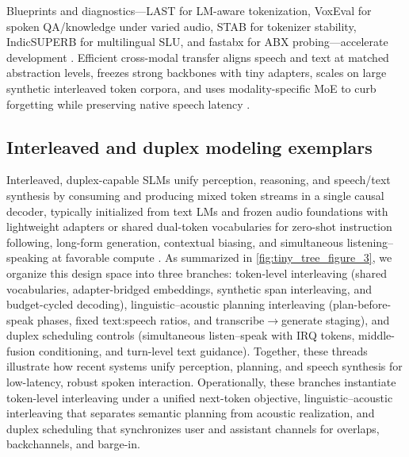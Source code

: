 \documentclass{article}
\begin{document}
Blueprints and diagnostics---LAST for LM-aware tokenization, VoxEval for spoken QA/knowledge under varied audio, STAB for tokenizer stability, IndicSUPERB for multilingual SLU, and fastabx for ABX probing---accelerate development \cite{turetzky2024lastlanguagemodelawarespeechtokenization,cui2025voxevalbenchmarkingknowledgeunderstandin,vashishth2024stabspeechtokenizerassessmentbenchmark,entry2025indicsuperbspeechprocessinguniversalperf,poli2025fastabxlibraryefficientcomputationabxdis}. Efficient cross-modal transfer aligns speech and text at matched abstraction levels, freezes strong backbones with tiny adapters, scales on large synthetic interleaved token corpora, and uses modality-specific MoE to curb forgetting while preserving native speech latency \cite{cuervo2025textspeechlanguagemodelsimprovedcrossmod,shao2025deeptalktowardsseamlesssmartspeechintera,wang2023slmbridgethingapbetweenspeechtextfoundat,zeng2024scalingspeechtextpretrainingsyntheticint,entry2025towardjointlanguagemodelingspeechunitste}.

\subsection{Interleaved and duplex modeling exemplars} \label{subsec:Interleaved and duplex modeling exemplars}
Interleaved, duplex-capable SLMs unify perception, reasoning, and speech/text synthesis by consuming and producing mixed token streams in a single causal decoder, typically initialized from text LMs and frozen audio foundations with lightweight adapters or shared dual-token vocabularies for zero-shot instruction following, long-form generation, contextual biasing, and simultaneous listening--speaking at favorable compute \cite{maimon2025scalinganalysisinterleavedspeechtextlang,park2025longformspeechgenerationspokenlanguagemo,wang2023slmbridgethingapbetweenspeechtextfoundat,wang2025dualspeechlmtowardsunifiedspeechundersta,entry2025towardjointlanguagemodelingspeechunitste}. As summarized in \autoref{fig:tiny_tree_figure_3}, we organize this design space into three branches: token-level interleaving (shared vocabularies, adapter-bridged embeddings, synthetic span interleaving, and budget-cycled decoding), linguistic--acoustic planning interleaving (plan-before-speak phases, fixed text:speech ratios, and transcribe$\rightarrow$generate staging), and duplex scheduling controls (simultaneous listen--speak with IRQ tokens, middle-fusion conditioning, and turn-level text guidance). Together, these threads illustrate how recent systems unify perception, planning, and speech synthesis for low-latency, robust spoken interaction. Operationally, these branches instantiate token-level interleaving under a unified next-token objective, linguistic--acoustic interleaving that separates semantic planning from acoustic realization, and duplex scheduling that synchronizes user and assistant channels for overlaps, backchannels, and barge-in.
\end{document}
